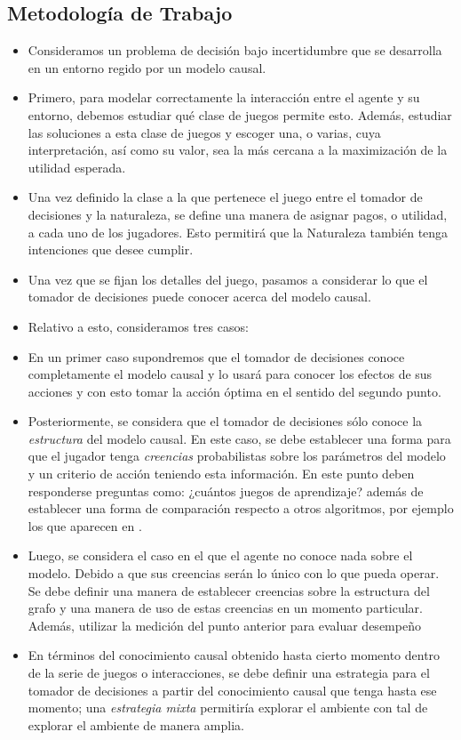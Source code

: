 \documentclass[11pt]{article}
\theoremstyle{plain}
\begin{document}
\subsection{Metodología de Trabajo}
\begin{itemize}
\item Consideramos un problema de decisión bajo incertidumbre que se desarrolla en un entorno regido por un modelo causal.
\item Primero, para modelar correctamente la interacción entre el agente y su entorno, debemos estudiar qué clase de juegos permite esto. Además, estudiar las soluciones a esta clase de juegos y escoger una, o varias, cuya interpretación, así como su valor, sea la más cercana a la maximización de la utilidad esperada.

\item Una vez definido la clase a la que pertenece el juego entre el tomador de decisiones y la naturaleza, se define una manera de asignar pagos, o utilidad, a cada uno de los jugadores. Esto permitirá que la Naturaleza también tenga intenciones que desee cumplir.

\item Una vez que se fijan los detalles del juego, pasamos a considerar lo que el tomador de decisiones puede conocer acerca del modelo causal.

\item Relativo a esto, consideramos tres casos:

\item En un primer caso supondremos que el tomador de decisiones conoce completamente el modelo causal y lo usará para conocer los efectos de sus acciones y con esto tomar la acción óptima en el sentido del segundo punto.

\item Posteriormente, se considera que el tomador de decisiones sólo conoce la \textit{estructura} del modelo causal. En este caso, se debe establecer una forma para que el jugador tenga \textit{creencias} probabilistas sobre los parámetros del modelo y un criterio de acción teniendo esta información. En este punto deben responderse preguntas como: ¿cuántos juegos de aprendizaje? además de establecer una forma de comparación respecto a otros algoritmos, por ejemplo los que aparecen en \cite{lattimoreNIPS2016}.

\item Luego, se considera el caso en el que el agente no conoce nada sobre el modelo. Debido a que sus creencias serán lo único con lo que pueda operar. Se debe definir una manera de establecer creencias sobre la estructura del grafo y una manera de uso de estas creencias en un momento particular. Además, utilizar la medición del punto anterior para evaluar desempeño

\item En términos del conocimiento causal obtenido hasta cierto momento dentro de la serie de juegos o interacciones, se debe definir una estrategia para el tomador de decisiones a partir del conocimiento causal que tenga hasta ese momento; una \textit{estrategia mixta} permitiría explorar el ambiente con tal de explorar el ambiente de manera amplia.

\end{itemize}
\end{document}
